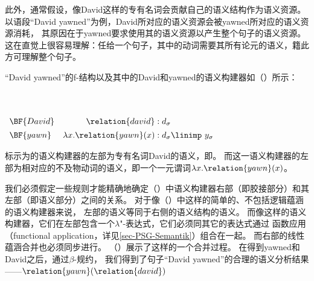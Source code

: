 此外，通常假设，像David这样的专有名词会贡献自己的语义结构作为语义资源。
以语段``David yawned''为例，David所对应的语义资源会被yawned所对应的语义资源消耗，
其原因在于yawned要求使用其\lfgsubj 的语义资源以产生整个句子的语义资源。
这在直觉上很容易理解：任给一个句子，其中的动词需要其所有论元的语义，籍此方可理解整个句子。
  
``David yawned''的f-结构以及其中的David和yawned的语义构建器如（）所示：

\eanoraggedright
 ~\\[-\baselineskip]
~\\[1em]
{$\begin{array}[t]{lr@{\;:\;}l}
\BF{David}&{\relation{david}}&{d_\sigma}\\*[1ex]
\BF{yawn}&{\lambda x. \relation{yawn}(x)}&{d_\sigma \linimp\ y_\sigma}
\end{array}$}
\z

\noindent 
标示为的语义构建器的左部为专有名词David的语义，即。
而\linebreak{}这一语义构建器的左部为相对应的不及物动词的语义，即一个一元谓词$\lambda x. \relation{yawn}(x)$。

我们必须假定一些规则才能精确地确定（）中语义构建器右部（即胶接部分）和其左部（即语义部分）之间的关系。
对于像（）中这样的简单的、不包括逻辑蕴涵的语义构建器来说，
左部的语义等同于右侧的语义结构的语义。
而像这样的语义构建器，它们在左部包含一个$\lambda$"-表达式，它们必须同其它的表达式通过
函数应用（functional application，详见\ref{sec-PSG-Semantik}）组合在一起。
而右部的线性蕴涵合并也必须同步进行。
（）展示了这样的一个合并过程。
在得到yawned和David之后，通过$\beta$-规约，
我们得到了句子``David yawned''的合理的语义分析结果——$\relation{yawn}(\relation{david})$ 

